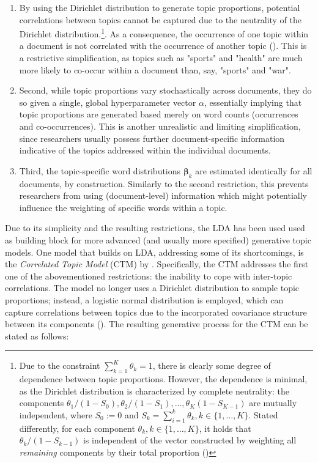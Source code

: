 \documentclass[12pt]{article}
\begin{document}
\begin{enumerate}[label=(\roman*)]
\vspace{-0.25cm}
\item By using the Dirichlet distribution to generate topic proportions, potential correlations between topics cannot be captured due to the neutrality of the Dirichlet distribution.\footnote{Due to the constraint $\sum_{k=1}^{K}\theta_{k}=1$, there is clearly some degree of dependence between topic proportions. However, the dependence is minimal, as the Dirichlet distribution is characterized by complete neutrality: the components $\theta_1/(1-S_0), \theta_2/(1-S_1),\dots, \theta_K(1-S_{K-1})$ are mutually independent, where $S_0:=0$ and $S_k = \sum_{i=1}^{k}\theta_k, k \in \{1,\dots,K\}$. Stated differently, for each component $\theta_k, k \in \{1,\dots,K\}$, it holds that $\theta_k/(1-S_{k-1})$ is independent of the vector constructed by weighting all \textit{remaining} components by their total proportion (\citealp{james1980new})}. As a consequence, the occurrence of one topic within a document is not correlated with the occurrence of another topic (\citealp{blei2007correlated}). This is a restrictive simplification, as topics such as "sports" and "health" are much more likely to co-occur within a document than, say, "sports" and "war".
\vspace{-0.25cm}
\item Second, while topic proportions vary stochastically across documents, they do so given a single, global hyperparameter vector $\alpha$, essentially implying that topic proportions are generated based merely on word counts (occurrences and co-occurrences). This is another unrealistic and limiting simplification, since researchers usually possess further document-specific information indicative of the topics addressed within the individual documents.
\vspace{-0.25cm}
\item Third, the topic-specific word distributions $\boldsymbol{\beta}_k$ are estimated identically for all documents, by construction. Similarly to the second restriction, this prevents researchers from using (document-level) information which might potentially influence the weighting of specific words within a topic.

\end{enumerate}

\noindent
Due to its simplicity and the resulting restrictions, the LDA has been used used as building block for more advanced (and usually more specified) generative topic models. One model that builds on LDA, addressing some of its shortcomings, is the \textit{Correlated Topic Model} (CTM) by \cite{blei2007correlated}. Specifically, the CTM addresses the first one of the abovementioned restrictions: the inability to cope with inter-topic correlations. The model no longer uses a Dirichlet distribution to sample topic proportions; instead, a logistic normal distribution is employed, which can capture correlations between topics due to the incorporated covariance structure between its components (\citealp{atchison1980logistic}). The resulting generative process for the CTM can be stated as follows:
\end{document}
